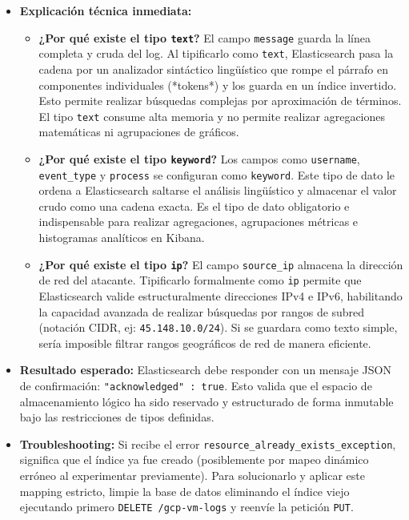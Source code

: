 \documentclass[
  coursetitle={Cómputo Nube y Tecnologías Emergentes},
  coursehours={96},
  coursedate={Verano 2026},
  doctype={Práctica},
  otherlangs={english,french},
  authorname={Lázaro},
  authorsurname={Bustio-Martínez},
  authortitle={PhD},
  role={Profesor Investigador},
  email={lbustio@inaoe.mx},
  phone={5559504000},
  ext={7459},
  institution={Instituto Nacional de Astrofísica, Óptica y Electrónica (INAOE)},
  department={Maestría en Ciencias en Tecnologías de Seguridad},
  address={Luis Enrique Erro 1, Sta. Ma. Tonantzintla, San Andrés Cholula, CP 72840, Puebla, México},
  margin={0.5in}
]{../../lbustio_lecture_notes}
\begin{document}
\begin{itemize}
    \item \textbf{Explicación técnica inmediata:} 
    \begin{itemize}
        \item \textbf{¿Por qué existe el tipo \texttt{text}?} El campo \texttt{message} guarda la línea completa y cruda del log. Al tipificarlo como \texttt{text}, Elasticsearch pasa la cadena por un analizador sintáctico lingüístico que rompe el párrafo en componentes individuales (*tokens*) y los guarda en un índice invertido. Esto permite realizar búsquedas complejas por aproximación de términos. El tipo \texttt{text} consume alta memoria y no permite realizar agregaciones matemáticas ni agrupaciones de gráficos.
        \item \textbf{¿Por qué existe el tipo \texttt{keyword}?} Los campos como \texttt{username}, \texttt{event\_type} y \texttt{process} se configuran como \texttt{keyword}. Este tipo de dato le ordena a Elasticsearch saltarse el análisis lingüístico y almacenar el valor crudo como una cadena exacta. Es el tipo de dato obligatorio e indispensable para realizar agregaciones, agrupaciones métricas e histogramas analíticos en Kibana.
        \item \textbf{¿Por qué existe el tipo \texttt{ip}?} El campo \texttt{source\_ip} almacena la dirección de red del atacante. Tipificarlo formalmente como \texttt{ip} permite que Elasticsearch valide estructuralmente direcciones IPv4 e IPv6, habilitando la capacidad avanzada de realizar búsquedas por rangos de subred (notación CIDR, ej: \texttt{45.148.10.0/24}). Si se guardara como texto simple, sería imposible filtrar rangos geográficos de red de manera eficiente.
    \end{itemize}
    
    \item \textbf{Resultado esperado:} Elasticsearch debe responder con un mensaje JSON de confirmación: \texttt{"acknowledged" : true}. Esto valida que el espacio de almacenamiento lógico ha sido reservado y estructurado de forma inmutable bajo las restricciones de tipos definidas.
    
    \item \textbf{Troubleshooting:} Si recibe el error \texttt{resource\_already\_exists\_exception}, significa que el índice ya fue creado (posiblemente por mapeo dinámico erróneo al experimentar previamente). Para solucionarlo y aplicar este mapping estricto, limpie la base de datos eliminando el índice viejo ejecutando primero \texttt{DELETE /gcp-vm-logs} y reenvíe la petición \texttt{PUT}.
\end{itemize}
\end{document}
